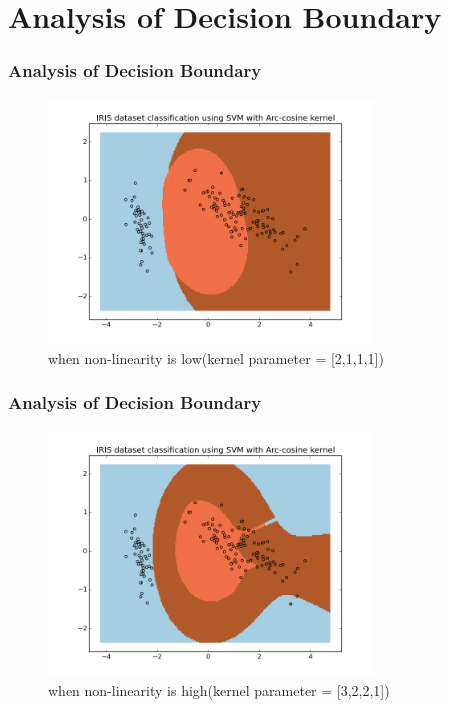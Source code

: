 \documentclass{beamer}
\begin{document}
\section{Analysis of Decision Boundary}

\begin{frame}
\frametitle{Analysis of Decision Boundary}
\begin{figure}
\includegraphics[width=0.7\linewidth, height=6.5cm]{figures/db1_2111}
\caption{when non-linearity is low(kernel parameter = [2,1,1,1])}
\end{figure}
\end{frame}

\begin{frame}
\frametitle{Analysis of Decision Boundary}
\begin{figure}
\includegraphics[width=0.7\linewidth, height=6.5cm]{figures/db2_3221}
\caption{when non-linearity is high(kernel parameter = [3,2,2,1])}
\end{figure}
\end{frame}

\end{document}
